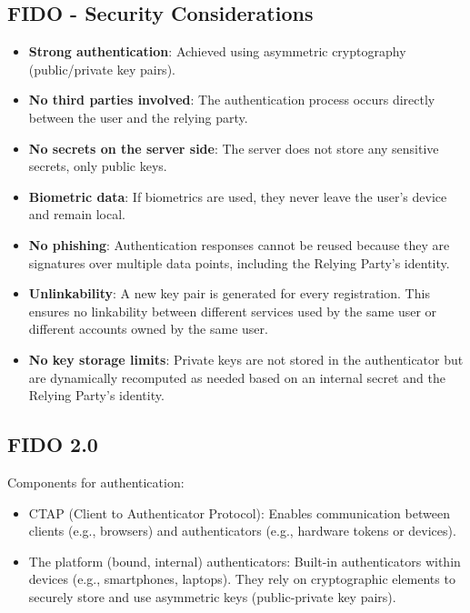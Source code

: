 \subsection*{FIDO - Security Considerations}
\begin{itemize}
    \item \textbf{Strong authentication}: Achieved using asymmetric cryptography (public/private key pairs).
    \item \textbf{No third parties involved}: The authentication process occurs directly between the user and the relying party.
    \item \textbf{No secrets on the server side}: The server does not store any sensitive secrets, only public keys.
    \item \textbf{Biometric data}: If biometrics are used, they never leave the user's device and remain local.
    \item \textbf{No phishing}: Authentication responses cannot be reused because they are signatures over multiple data points, including the Relying Party's identity.
    \item \textbf{Unlinkability}: A new key pair is generated for every registration. This ensures no linkability between different services used by the same user or different accounts owned by the same user.
    \item \textbf{No key storage limits}: Private keys are not stored in the authenticator but are dynamically recomputed as needed based on an internal secret and the Relying Party's identity.
\end{itemize}

\subsection*{FIDO 2.0}
Components for authentication:
\begin{itemize}
    \item CTAP (Client to Authenticator Protocol): Enables communication between clients (e.g., browsers) and authenticators (e.g., hardware tokens or devices).
    \item The platform (bound, internal) authenticators: Built-in authenticators within devices (e.g., smartphones, laptops). They rely on cryptographic elements to securely store and use asymmetric keys (public-private key pairs).
\end{itemize}

